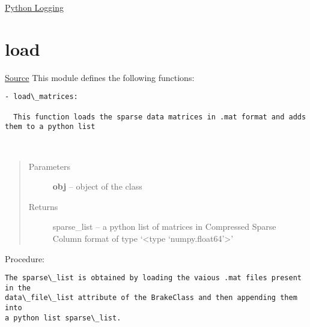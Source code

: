\documentclass[letterpaper,10pt,english]{sphinxmanual}
\begin{document}


\href{https://docs.python.org/2/library/logging.html}{Python Logging}




\section{load}
\label{index:load}
\href{https://bitbucket.org/akadar/brakesqueal0.1/src/master/brake/initialize/load.py?at=master}{Source}
\label{index:module-brake.initialize.load}
This module defines the following functions:

\begin{Verbatim}[commandchars=\\\{\}]
- load\_matrices:

  This function loads the sparse data matrices in .mat format and adds them to a python list
\end{Verbatim}

\begin{fulllineitems}
\label{index:brake.initialize.load.load_matrices}~\begin{quote}\begin{description}
\item[{Parameters}] \leavevmode
\textbf{obj} -- object of the class 

\item[{Returns}] \leavevmode
sparse\_list -- a python list of matrices in Compressed Sparse Column format 
of type `\textless{}type `numpy.float64'\textgreater{}'

\end{description}\end{quote}

Procedure:

\begin{Verbatim}[commandchars=\\\{\}]
The sparse\_list is obtained by loading the vaious .mat files present in the
data\_file\_list attribute of the BrakeClass and then appending them into
a python list sparse\_list.
\end{Verbatim}

\end{fulllineitems}



\end{document}
